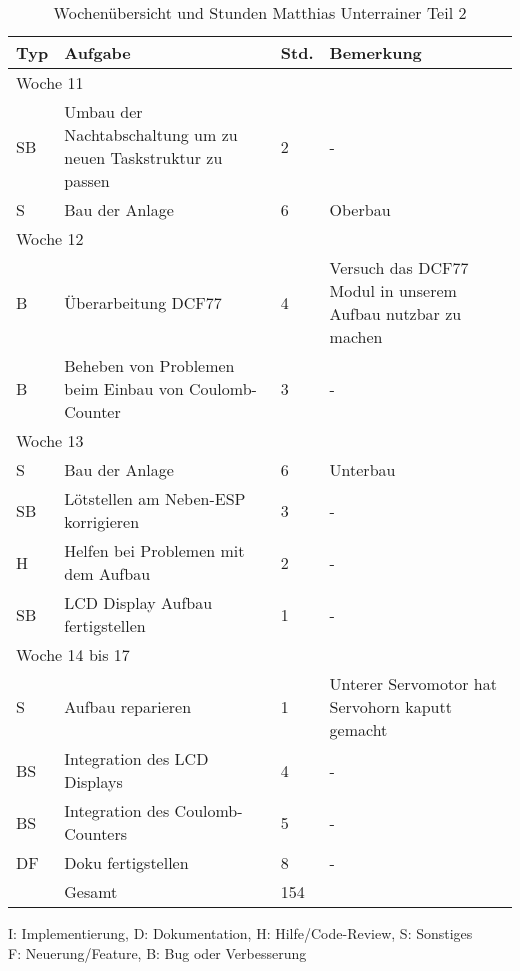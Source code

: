 \begin{table}[!hp]
    \begin{center}
        \begin{tabular}{|p{0.8cm}|p{6cm}|p{0.8cm}|p{8cm}|} \hline
            \textbf{Typ} & \textbf{Aufgabe}                & \textbf{Std.} & \textbf{Bemerkung}                                                               \\ \hline    
            \multicolumn{4}{|l|}{Woche 11}                                                           \\ \hline
            SB & Umbau der Nachtabschaltung um zu neuen Taskstruktur zu passen & 2 & - \\
            S   & Bau der Anlage & 6 & Oberbau  \\  \hline
            \multicolumn{4}{|l|}{Woche 12}                                                           \\ \hline
            B & Überarbeitung DCF77 & 4 & Versuch das DCF77 Modul in unserem Aufbau nutzbar zu machen \\ 
            B & Beheben von Problemen beim Einbau von Coulomb-Counter & 3 & - \\ \hline          
            \multicolumn{4}{|l|}{Woche 13}                                                           \\ \hline
            S   & Bau der Anlage & 6 & Unterbau \\
            SB  & Lötstellen am Neben-ESP korrigieren & 3 & - \\
            H & Helfen bei Problemen mit dem Aufbau & 2 & - \\
            SB & LCD Display Aufbau fertigstellen & 1 & - \\ \hline     
            \multicolumn{4}{|l|}{Woche 14 bis 17}                                                    \\ \hline      
            S            & Aufbau reparieren               & 1             & Unterer Servomotor hat Servohorn kaputt gemacht \\
            BS & Integration des LCD Displays & 4 & - \\
            BS & Integration des Coulomb-Counters & 5 & - \\
            DF & Doku fertigstellen                     & 8 & - \\ \hline
            \Xhline{3\arrayrulewidth}
            & Gesamt & 154 & \\ \hline
        \end{tabular}
        \end{center}
        \label{tab:overviewMatthias2}
        \caption{Wochenübersicht und Stunden Matthias Unterrainer Teil 2}
            I: Implementierung, D: Dokumentation, H: Hilfe/Code-Review, S: Sonstiges\\
            F: Neuerung/Feature, B: Bug oder Verbesserung\\
\end{table}
\vspace{1em}

\newpage